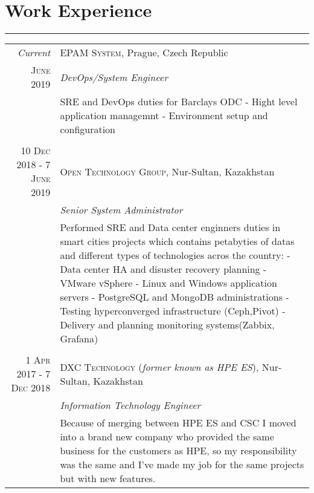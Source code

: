 \documentclass[a4paper,10pt]{article}
\begin{document}
\section*{Work Experience}
\vspace{-0.5ex}%
\rule{\textwidth}{0.3pt}
\vspace{-0.5ex}%
\begin{tabular}{r|p{11cm}}
\emph{Current} & \textsc{EPAM System}, Prague, Czech Republic \\
\textsc{June 2019} & \emph{DevOps/System Engineer}\\ 
& \footnotesize{\textnormal{SRE and DevOps duties for Barclays ODC\newline
- Hight level application managemnt\newline
- Environment setup and configuration}}\\
\multicolumn{2}{c}{} \\
\textsc{10 Dec 2018 - 7 June 2019} & \textsc{Open Technology Group}, Nur-Sultan, Kazakhstan \\
                                   & \emph{Senior System Administrator}\\
& \footnotesize{\textnormal{Performed SRE and Data center enginners duties in smart cities projects which contains petabyties 
of datas and different types of technologies acros the country:\newline
- Data center HA and disuster recovery planning
- VMware vSphere\newline
- Linux and Windows application servers\newline
- PostgreSQL and MongoDB administrations\newline
- Testing hyperconverged infrastructure (Ceph,Pivot)\newline
- Delivery and planning monitoring systems(Zabbix, Grafana)}}\\
\multicolumn{2}{c}{} \\
\textsc{1 Apr 2017 - 7 Dec 2018} & \textsc{DXC Technology} (\emph{former known as HPE ES}), Nur-Sultan, Kazakhstan \\
                                 & \emph{Information Technology Engineer}\\
& \footnotesize{\textnormal{Because of merging between HPE ES and CSC I moved into a brand new company who provided the same business for the 
customers as HPE, so my responsibility was the same and I've made my job for the same projects but with new features.\newline
}}
\end{tabular}
\end{document}
